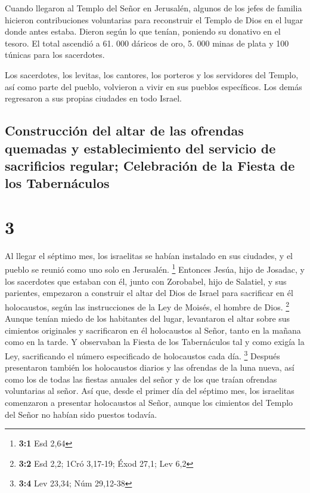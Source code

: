  Cuando llegaron al Templo del Señor en Jerusalén,
algunos de los jefes de familia hicieron contribuciones voluntarias para
reconstruir el Templo de Dios en el lugar donde antes estaba.
 Dieron según lo que tenían, poniendo su donativo en el
tesoro. El total ascendió a 61. 000 dáricos de oro, 5. 000 minas de
plata y 100 túnicas para los sacerdotes.

 Los sacerdotes, los levitas, los cantores, los porteros
y los servidores del Templo, así como parte del pueblo, volvieron a
vivir en sus pueblos específicos. Los demás regresaron a sus propias
ciudades en todo Israel.

\hypertarget{construcciuxf3n-del-altar-de-las-ofrendas-quemadas-y-establecimiento-del-servicio-de-sacrificios-regular-celebraciuxf3n-de-la-fiesta-de-los-tabernuxe1culos}{%
\subsection{Construcción del altar de las ofrendas quemadas y
establecimiento del servicio de sacrificios regular; Celebración de la
Fiesta de los
Tabernáculos}\label{construcciuxf3n-del-altar-de-las-ofrendas-quemadas-y-establecimiento-del-servicio-de-sacrificios-regular-celebraciuxf3n-de-la-fiesta-de-los-tabernuxe1culos}}

\hypertarget{section-2}{%
\section{3}\label{section-2}}

 Al llegar el séptimo mes, los israelitas se habían
instalado en sus ciudades, y el pueblo se reunió como uno solo en
Jerusalén. \footnote{\textbf{3:1} Esd 2,64}  Entonces
Jesúa, hijo de Josadac, y los sacerdotes que estaban con él, junto con
Zorobabel, hijo de Salatiel, y sus parientes, empezaron a construir el
altar del Dios de Israel para sacrificar en él holocaustos, según las
instrucciones de la Ley de Moisés, el hombre de Dios. \footnote{\textbf{3:2}
  Esd 2,2; 1Cró 3,17-19; Éxod 27,1; Lev 6,2}  Aunque
tenían miedo de los habitantes del lugar, levantaron el altar sobre sus
cimientos originales y sacrificaron en él holocaustos al Señor, tanto en
la mañana como en la tarde.  Y observaban la Fiesta de los
Tabernáculos tal y como exigía la Ley, sacrificando el número
especificado de holocaustos cada día. \footnote{\textbf{3:4} Lev 23,34;
  Núm 29,12-38}  Después presentaron también los
holocaustos diarios y las ofrendas de la luna nueva, así como los de
todas las fiestas anuales del señor y de los que traían ofrendas
voluntarias al señor.  Así que, desde el primer día del
séptimo mes, los israelitas comenzaron a presentar holocaustos al Señor,
aunque los cimientos del Templo del Señor no habían sido puestos
todavía.

